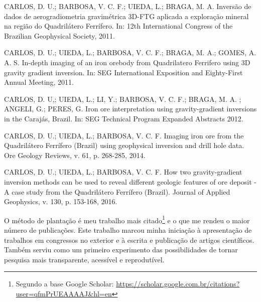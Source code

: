 \begin{displayquote}
    CARLOS, D. U.; BARBOSA, V. C. F.; UIEDA, L.; BRAGA, M. A. Inversão de
    dados de aerogradiometria gravimétrica 3D-FTG aplicada a exploração mineral
    na região do Quadrilátero Ferrífero. In: 12th International Congress of the
    Brazilian Geophysical Society, 2011.
\end{displayquote}

\begin{displayquote}
    CARLOS, D. U.; UIEDA, L.; BARBOSA, V. C. F.; BRAGA,
    M. A.; GOMES, A. A. S. In-depth imaging of an iron
    orebody from Quadrilatero Ferrifero using 3D gravity gradient inversion.
    In: SEG International Exposition and Eighty-First Annual Meeting, 2011.
\end{displayquote}

\begin{displayquote}
    CARLOS, D. U,; UIEDA, L.; LI, Y.; BARBOSA, V.
    C. F.; BRAGA, M. A. ; ANGELI, G.; PERES, G. Iron ore
    interpretation using gravity-gradient inversions in the Carajás, Brazil.
    In: SEG Technical Program Expanded Abstracts 2012.
\end{displayquote}

\begin{displayquote}
    CARLOS, D. U.; UIEDA, L.; BARBOSA, V. C. F. Imaging
    iron ore from the Quadrilátero Ferrífero (Brazil) using geophysical
    inversion and drill hole data. Ore Geology Reviews, v. 61, p. 268-285,
    2014.
\end{displayquote}

\begin{displayquote}
    CARLOS, D. U.; UIEDA, L.; BARBOSA, V. C. F. How two
    gravity-gradient inversion methods can be used to reveal different geologic
    features of ore deposit - A case study from the Quadrilátero Ferrífero
    (Brazil). Journal of Applied Geophysics, v. 130, p. 153-168, 2016.
\end{displayquote}


O método de plantação \citep{seed} é meu trabalho mais citado\footnote{Segundo
a base Google Scholar:
\url{https://scholar.google.com.br/citations?user=qfmPrUEAAAAJ&hl=en}} e o que
me rendeu o maior número de publicações.
Este trabalho marcou minha iniciação
à apresentação de trabalhos em congressos no exterior e
à escrita e publicação de artigos científicos.
Também serviu como um primeiro experimento das possibilidades de tornar
pesquisa mais transparente, acessível e reprodutível.


